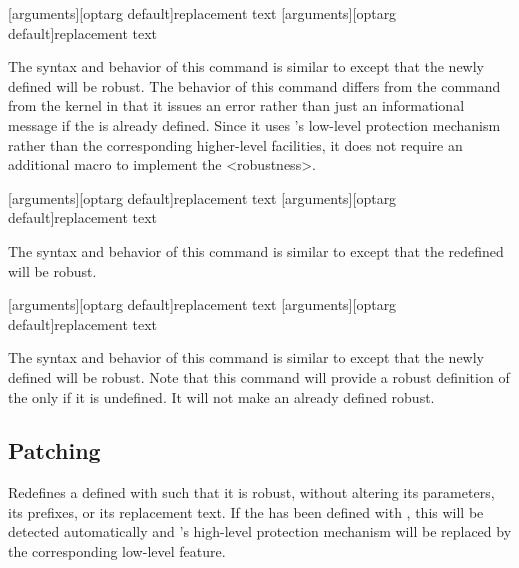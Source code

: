 \documentclass{ltxdockit}[2010/09/26]
\begin{document}
\begin{ltxsyntax}

[arguments][optarg default]{replacement text}
[arguments][optarg default]{replacement text}

The syntax and behavior of this command is similar to  except that the newly defined  will be robust. The behavior of this command differs from the  command from the \latex kernel in that it issues an error rather than just an informational message if the  is already defined. Since it uses \etex's low-level protection mechanism rather than the corresponding higher-level \latex facilities, it does not require an additional macro to implement the <robustness>.

[arguments][optarg default]{replacement text}
[arguments][optarg default]{replacement text}

The syntax and behavior of this command is similar to  except that the redefined  will be robust.

[arguments][optarg default]{replacement text}
[arguments][optarg default]{replacement text}

The syntax and behavior of this command is similar to  except that the newly defined  will be robust. Note that this command will provide a robust definition of the  only if it is undefined. It will not make an already defined  robust.

\end{ltxsyntax}

\subsection{Patching}
\label{use:pat}

\begin{ltxsyntax}


Redefines a  defined with  such that it is robust, without altering its parameters, its prefixes, or its replacement text. If the  has been defined with , this will be detected automatically and \latex's high-level protection mechanism will be replaced by the corresponding low-level \etex feature.

\end{ltxsyntax}
\end{document}
